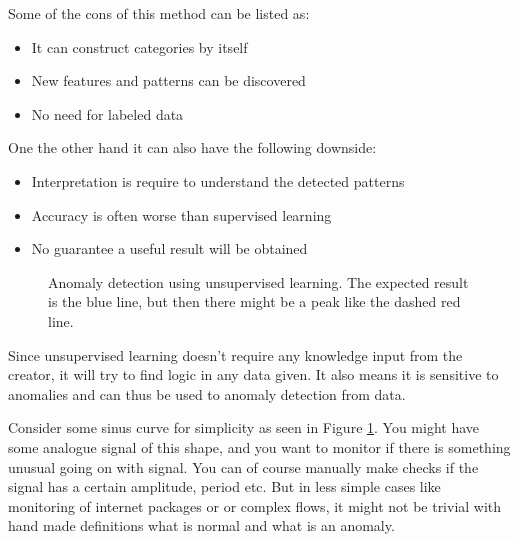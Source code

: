 \documentclass[12pt,a4paper]{article} %
\numberwithin{equation}{section}
\begin{document}
			Some of the cons of this method can be listed as:
			\begin{itemize}
				\item It can construct categories by itself
				\item New features and patterns can be discovered
				\item No need for labeled data
			\end{itemize}
			One the other hand it can also have the following downside:
			\begin{itemize}
				\item Interpretation is require to understand the detected patterns
				\item Accuracy is often worse than supervised learning
				\item No guarantee a useful result will be obtained
			\end{itemize}

			\begin{figure}
				\centering
				\caption{Anomaly detection using unsupervised learning. The expected result is the blue line, but then there might be a peak like the dashed red line.}
				\label{fig:anomaly}
			\end{figure}
					
			Since unsupervised learning doesn't require any knowledge input from the creator, it will try to find logic in any data given. It also means it is sensitive to anomalies and can thus be used to anomaly detection from data.
			
			Consider some sinus curve for simplicity as seen in Figure \ref{fig:anomaly}. You might have some analogue signal of this shape, and you want to monitor if there is something unusual going on with signal. You can of course manually make checks if the signal has a certain amplitude, period etc. But in less simple cases like monitoring of internet packages or or complex flows, it might not be trivial with hand made definitions what is normal and what is an anomaly.
			
\end{document}
